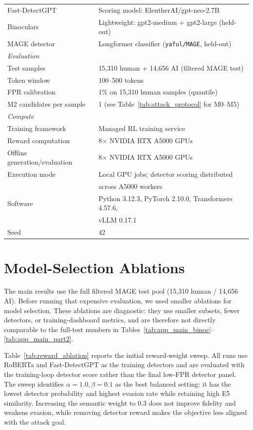 \documentclass[11pt]{article}
\begin{document}
\begin{center}
{\begin{tabular}{ll}
Fast-DetectGPT & Scoring model: EleutherAI/gpt-neo-2.7B \\
Binoculars & Lightweight: gpt2-medium + gpt2-large (held-out) \\
MAGE detector & Longformer classifier (\texttt{yaful/MAGE}, held-out) \\
\midrule
\multicolumn{2}{l}{\textit{Evaluation}} \\
Test samples & 15,310 human + 14,656 AI (filtered MAGE test) \\
Token window & 100--500 tokens \\
FPR calibration & 1\% on 15,310 human samples (quantile) \\
M2 candidates per sample & 1 (see Table~\ref{tab:attack_protocol} for M0--M5) \\
\midrule
\multicolumn{2}{l}{\textit{Compute}} \\
Training framework & Managed RL training service \\
Reward computation & 8$\times$ NVIDIA RTX A5000 GPUs \\
Offline generation/evaluation & 8$\times$ NVIDIA RTX A5000 GPUs \\
Execution mode & Local GPU jobs; detector scoring distributed \\
& across A5000 workers \\
Software & Python 3.12.3, PyTorch 2.10.0, Transformers 4.57.6, \\
& vLLM 0.17.1 \\
Seed & 42 \\
\bottomrule
\end{tabular}
}
\label{tab:hyperparams}
\end{center}

\FloatBarrier
\section{Model-Selection Ablations}
\label{app:ablations}

The main results use the full filtered MAGE test pool (15,310 human / 14,656 AI). Before running that expensive evaluation, we used smaller ablations for model selection. These ablations are diagnostic: they use smaller subsets, fewer detectors, or training-dashboard metrics, and are therefore not directly comparable to the full-test numbers in Tables~\ref{tab:app_main_binoc}--\ref{tab:app_main_part2}.

Table~\ref{tab:reward_ablation} reports the initial reward-weight sweep. All runs use RoBERTa and Fast-DetectGPT as the training detectors and are evaluated with the training-loop detector score rather than the final low-FPR detector panel. The sweep identifies $\alpha{=}1.0,\beta{=}0.1$ as the best balanced setting: it has the lowest detector probability and highest evasion rate while retaining high E5 similarity. Increasing the semantic weight to 0.3 does not improve fidelity and weakens evasion, while removing detector reward makes the objective less aligned with the attack goal.
\end{document}
